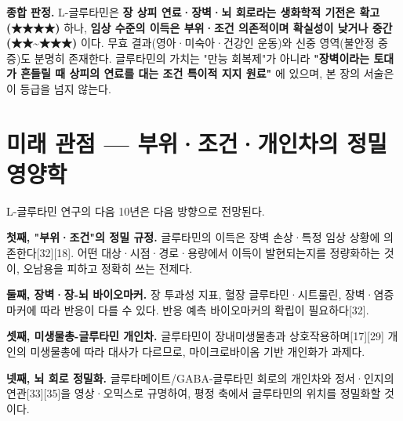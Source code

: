 \documentclass[11pt,oneside]{book}
\begin{document}
\textbf{종합 판정.} L-글루타민은 \textbf{장 상피 연료·장벽·뇌 회로라는 생화학적 기전은 확고(★★★★)} 하나, \textbf{임상 수준의 이득은 부위·조건 의존적이며 확실성이 낮거나 중간(★★\textasciitilde{}★★★)} 이다. 무효 결과(영아·미숙아·건강인 운동)와 신중 영역(불안정 중증)도 분명히 존재한다. 글루타민의 가치는 "만능 회복제"가 아니라 \textbf{"장벽이라는 토대가 흔들릴 때 상피의 연료를 대는 조건 특이적 지지 원료"} 에 있으며, 본 장의 서술은 이 등급을 넘지 않는다.

\section{미래 관점 — 부위·조건·개인차의 정밀 영양학}
L-글루타민 연구의 다음 10년은 다음 방향으로 전망된다.

\textbf{첫째, "부위·조건"의 정밀 규정.} 글루타민의 이득은 장벽 손상·특정 임상 상황에 의존한다[32][18]. 어떤 대상·시점·경로·용량에서 이득이 발현되는지를 정량화하는 것이, 오남용을 피하고 정확히 쓰는 전제다.

\textbf{둘째, 장벽·장-뇌 바이오마커.} 장 투과성 지표, 혈장 글루타민·시트룰린, 장벽·염증 마커에 따라 반응이 다를 수 있다. 반응 예측 바이오마커의 확립이 필요하다[32].

\textbf{셋째, 미생물총-글루타민 개인차.} 글루타민이 장내미생물총과 상호작용하며[17][29] 개인의 미생물총에 따라 대사가 다르므로, 마이크로바이옴 기반 개인화가 과제다.

\textbf{넷째, 뇌 회로 정밀화.} 글루타메이트/GABA-글루타민 회로의 개인차와 정서·인지의 연관[33][35]을 영상·오믹스로 규명하여, 평정 축에서 글루타민의 위치를 정밀화할 것이다.
\end{document}
